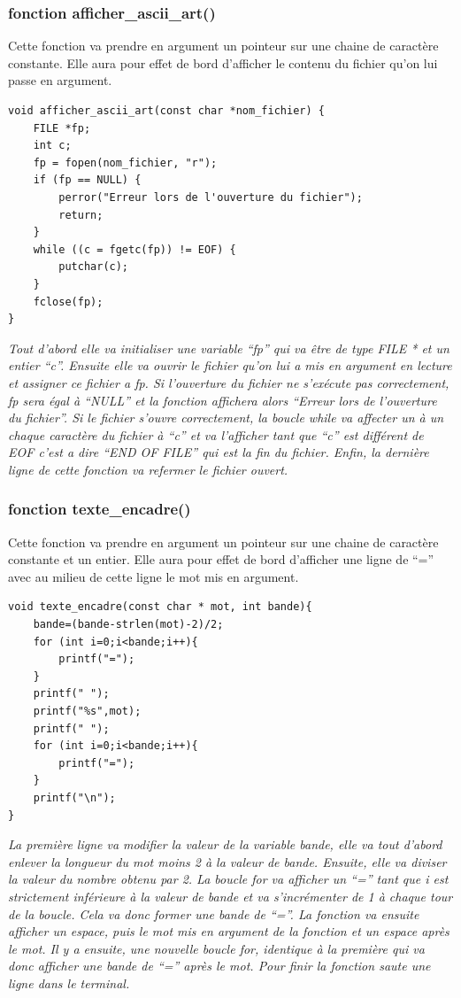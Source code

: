 \documentclass[10pt,a4paper,french,titlepage]{article}
\begin{document}
\subsubsection{fonction afficher\_ascii\_art()}
Cette fonction va prendre en argument un pointeur sur une chaine de caractère constante. Elle aura pour effet de bord d'afficher le contenu du fichier qu'on lui passe en argument.
\begin{lstlisting}
void afficher_ascii_art(const char *nom_fichier) {
    FILE *fp;
    int c;
    fp = fopen(nom_fichier, "r");
    if (fp == NULL) {
        perror("Erreur lors de l'ouverture du fichier");
        return;
    }
    while ((c = fgetc(fp)) != EOF) {
        putchar(c);
    }
    fclose(fp);
}
\end{lstlisting}
\textit{Tout d'abord elle va initialiser une variable “fp” qui va être de type FILE * et un entier “c”. Ensuite elle va ouvrir le fichier qu’on lui a mis en argument en lecture et assigner ce fichier a fp. Si l'ouverture du fichier ne s’exécute pas correctement, fp sera égal à “NULL” et la fonction affichera alors “Erreur lors de l'ouverture du fichier”. Si le fichier s'ouvre correctement, la boucle while va affecter un à un chaque caractère du fichier à “c” et va l'afficher tant que “c” est différent de EOF c’est a dire “END OF FILE” qui est la fin du fichier. Enfin, la dernière ligne de cette fonction va refermer le fichier ouvert.}
\subsubsection{fonction texte\_encadre()}
Cette fonction va prendre en argument un pointeur sur une chaine de caractère constante et un entier. Elle aura pour effet de bord d'afficher une ligne de “=” avec au milieu de cette ligne le mot mis en argument.
\begin{lstlisting}
void texte_encadre(const char * mot, int bande){
    bande=(bande-strlen(mot)-2)/2;
    for (int i=0;i<bande;i++){
        printf("=");
    }
    printf(" ");
    printf("%s",mot);
    printf(" ");
    for (int i=0;i<bande;i++){
        printf("=");
    }
    printf("\n");
}
\end{lstlisting}
\textit{La première ligne va modifier la valeur de la variable bande, elle va tout d'abord enlever la longueur du mot moins 2 à la valeur de bande. Ensuite, elle va diviser la valeur du nombre obtenu par 2. La boucle for va afficher un “=” tant que i est strictement inférieure à la valeur de bande et va s'incrémenter de 1 à chaque tour de la boucle. Cela va donc former une bande de “=”. La fonction va ensuite afficher un espace, puis le mot mis en argument de la fonction et un espace après le mot. Il y a ensuite, une nouvelle boucle for, identique à la première qui va donc afficher une bande de “=” après le mot. Pour finir la fonction saute une ligne dans le terminal.}
\end{document}
